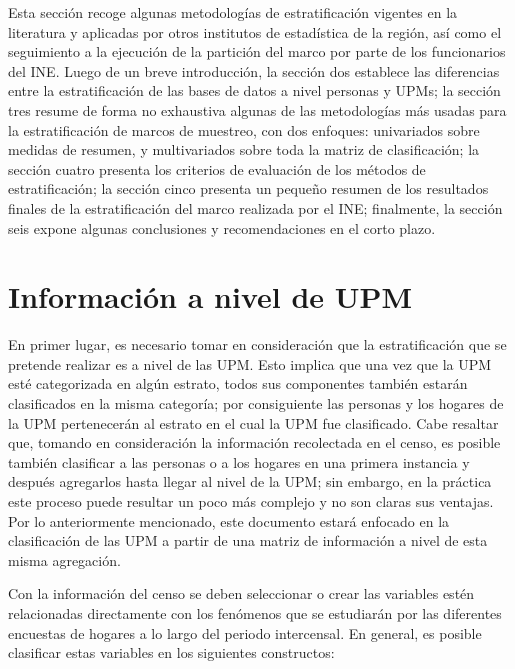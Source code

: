 \documentclass[12pt,spanish,]{book}
\begin{document}
Esta sección recoge algunas metodologías de estratificación vigentes en la literatura y aplicadas por otros institutos de estadística de la región, así como el seguimiento a la ejecución de la partición del marco por parte de los funcionarios del INE. Luego de un breve introducción, la sección dos establece las diferencias entre la estratificación de las bases de datos a nivel personas y UPMs; la sección tres resume de forma no exhaustiva algunas de las metodologías más usadas para la estratificación de marcos de muestreo, con dos enfoques: univariados sobre medidas de resumen, y multivariados sobre toda la matriz de clasificación; la sección cuatro presenta los criterios de evaluación de los métodos de estratificación; la sección cinco presenta un pequeño resumen de los resultados finales de la estratificación del marco realizada por el INE; finalmente, la sección seis expone algunas conclusiones y recomendaciones en el corto plazo.

\hypertarget{informacion-a-nivel-de-upm}{%
\section{Información a nivel de UPM}\label{informacion-a-nivel-de-upm}}

En primer lugar, es necesario tomar en consideración que la estratificación que se pretende realizar es a nivel de las UPM. Esto implica que una vez que la UPM esté categorizada en algún estrato, todos sus componentes también estarán clasificados en la misma categoría; por consiguiente las personas y los hogares de la UPM pertenecerán al estrato en el cual la UPM fue clasificado. Cabe resaltar que, tomando en consideración la información recolectada en el censo, es posible también clasificar a las personas o a los hogares en una primera instancia y después agregarlos hasta llegar al nivel de la UPM; sin embargo, en la práctica este proceso puede resultar un poco más complejo y no son claras sus ventajas. Por lo anteriormente mencionado, este documento estará enfocado en la clasificación de las UPM a partir de una matriz de información a nivel de esta misma agregación.

Con la información del censo se deben seleccionar o crear las variables estén relacionadas directamente con los fenómenos que se estudiarán por las diferentes encuestas de hogares a lo largo del periodo intercensal. En general, es posible clasificar estas variables en los siguientes constructos:
\end{document}
